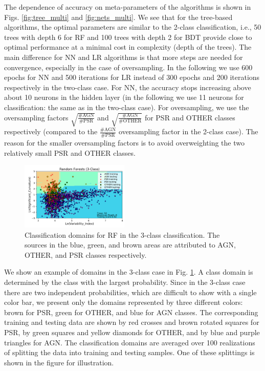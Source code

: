 \documentclass{aa}
\begin{document}
The dependence of accuracy on meta-parameters of the algorithms is shown in Figs. \ref{fig:tree_multi} and \ref{fig:nets_multi}.
We see that for the tree-based algorithms, the optimal parameters are similar to the 2-class classification, i.e., 50 trees with depth 6 for RF and 100 trees with depth 2 for BDT 
provide close to optimal performance at a minimal cost in complexity (depth of the trees).
The main difference for NN and LR algorithms is that more steps are needed for convergence, especially in the case of oversampling. 
In the following we use 600 epochs for NN and 500 iterations for LR instead of 300 epochs and 200 iterations respectively in the two-class case.
For NN, the accuracy stops increasing above about 10 neurons in the hidden layer (in the following we use 11 neurons for classification: the same as in the two-class case).
For oversampling, we use the oversampling factors $\sqrt{\frac{\text{\# AGN}}{\text{\# PSR}}}$ and $\sqrt{\frac{\text{\# AGN}}{\text{\# OTHER}}}$ for PSR and OTHER classes respectively (compared to the $\frac{\text{\# AGN}}{\text{\# PSR}}$ oversampling factor in the 2-class case).
The reason for the smaller oversampling factors is to avoid overweighting the two relatively small PSR and OTHER classes.

\begin{figure}[h]
\centering
\includegraphics[width=0.46\textwidth]{plots/classification_domains/rf_50_6_3class.pdf}
\caption{Classification domains for RF in the 3-class classification.
The sources in the blue, green, and brown areas are attributed to AGN, OTHER, and PSR classes respectively.
}
\label{fig:RF_domains_3class}
\end{figure}

We show an example of domains in the 3-class case in Fig. \ref{fig:RF_domains_3class}.
A class domain is determined by the class with the largest probability.
Since in the 3-class case there are two independent probabilities, which are difficult to show with a single color bar,
we present only the domains represented by three different colors: brown for PSR, green for OTHER, and blue for AGN classes.
The corresponding training and testing data are shown by red crosses and brown rotated squares for PSR, by green squares and yellow diamonds for OTHER,
and by blue and purple triangles for AGN.
The classification domains are averaged over 100 realizations of splitting the data into training and testing samples.
One of these splittings is shown in the figure for illustration.
\end{document}

